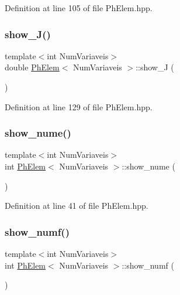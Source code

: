 Definition at line 105 of file Ph\+Elem.\+hpp.

\mbox{\label{classPhElem_a63b2f67b4f782432909cd7d32d188996}} 
\subsubsection{\texorpdfstring{show\+\_\+\+J()}{show\_J()}}
{\footnotesize\ttfamily template$<$int Num\+Variaveis$>$ \\
double \hyperlink{classPhElem}{Ph\+Elem}$<$ Num\+Variaveis $>$\+::show\+\_\+J (\begin{DoxyParamCaption}{ }\end{DoxyParamCaption})\hspace{0.3cm}{\ttfamily [inline]}}



Definition at line 129 of file Ph\+Elem.\+hpp.

\mbox{\label{classPhElem_aca4ef303cd316714d116062e8f4d8ca5}} 
\subsubsection{\texorpdfstring{show\+\_\+nume()}{show\_nume()}}
{\footnotesize\ttfamily template$<$int Num\+Variaveis$>$ \\
int \hyperlink{classPhElem}{Ph\+Elem}$<$ Num\+Variaveis $>$\+::show\+\_\+nume (\begin{DoxyParamCaption}{ }\end{DoxyParamCaption})\hspace{0.3cm}{\ttfamily [inline]}}



Definition at line 41 of file Ph\+Elem.\+hpp.

\mbox{\label{classPhElem_afbe63a88e47733c8daec89a4c72b7da0}} 
\subsubsection{\texorpdfstring{show\+\_\+numf()}{show\_numf()}}
{\footnotesize\ttfamily template$<$int Num\+Variaveis$>$ \\
int \hyperlink{classPhElem}{Ph\+Elem}$<$ Num\+Variaveis $>$\+::show\+\_\+numf (\begin{DoxyParamCaption}{ }\end{DoxyParamCaption})\hspace{0.3cm}{\ttfamily [inline]}}



